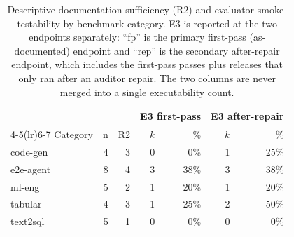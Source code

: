 \begin{table}[t]
\centering
\caption{Descriptive documentation sufficiency (R2) and evaluator smoke-testability
by benchmark category. E3 is reported at the two endpoints separately: ``fp''
is the primary first-pass (as-documented) endpoint and ``rep'' is the
secondary after-repair endpoint, which includes the first-pass passes plus
releases that only ran after an auditor repair. The two columns are never
merged into a single executability count.}
\label{tab:bycategory}
\begin{tabular}{lrrrrrr}
\toprule
 & & & \multicolumn{2}{c}{E3 first-pass} & \multicolumn{2}{c}{E3 after-repair} \\
\cmidrule(lr){4-5}\cmidrule(lr){6-7}
Category & n & R2 & $k$ & \% & $k$ & \% \\
\midrule
code-gen & 4 & 3 & 0 & 0\% & 1 & 25\% \\
e2e-agent & 8 & 4 & 3 & 38\% & 3 & 38\% \\
ml-eng & 5 & 2 & 1 & 20\% & 1 & 20\% \\
tabular & 4 & 3 & 1 & 25\% & 2 & 50\% \\
text2sql & 5 & 1 & 0 & 0\% & 0 & 0\% \\
\bottomrule
\end{tabular}
\end{table}
